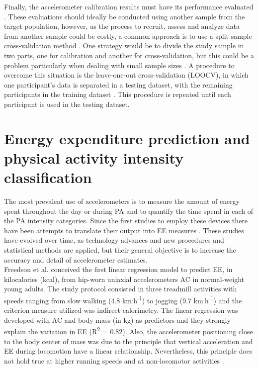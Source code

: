 \documentclass[11pt]{article}
\begin{document}
Finally, the accelerometer calibration results must have its performance evaluated \cite{Basset_2012}. These evaluations should ideally be conducted using another sample from the target population, however, as the process to recruit, assess and analyze data from another sample could be costly, a common approach is to use a split-sample cross-validation method \cite{Staudenmayer_2012}. One strategy would be to divide the study sample in two parts, one for calibration and another for cross-validation, but this could be a problem particularly when dealing with small sample sizes \cite{Staudenmayer_2012}. A procedure to overcome this situation is the leave-one-out cross-validation (LOOCV), in which one participant's data is separated in a testing dataset, with the remaining participants in the training dataset \cite{Staudenmayer_2012}. This procedure is repeated until each participant is used in the testing dataset.

\section*{Energy expenditure prediction and physical activity intensity classification}

The most prevalent use of accelerometers is to measure the amount of energy spent throughout the day or during PA and to quantify the time spend in each of the PA intensity categories. Since the first studies to employ these devices there have been attempts to translate their output into EE measures \cite{Wong_1981, Montoye_1983}. These studies have evolved over time, as technology advances and new procedures and statistical methods are applied, but their general objective is to increase the accuracy and detail of accelerometer estimates. \\

Freedson et al. \citeyear{Freedson_1998} conceived the first linear regression model to predict EE, in kilocalories (kcal), from hip-worn uniaxial accelerometers AC in normal-weight young adults. The study protocol consisted in three treadmill activities with speeds ranging from slow walking (4.8 km\textsuperscript{.}h\textsuperscript{-1}) to jogging (9.7 km\textsuperscript{.}h\textsuperscript{-1}) and the criterion measure utilized was indirect calorimetry. The linear regression was developed with AC and body mass (in kg) as predictors and they strongly explain the variation in EE  (R\textsuperscript{2} = 0.82). Also, the accelerometer positioning close to the body center of mass was due to the principle that vertical acceleration and EE during locomotion have a linear relationship. Nevertheless, this principle does not hold true at higher running speeds and at non-locomotor activities \cite{Lyden_2012}. \\
\end{document}
